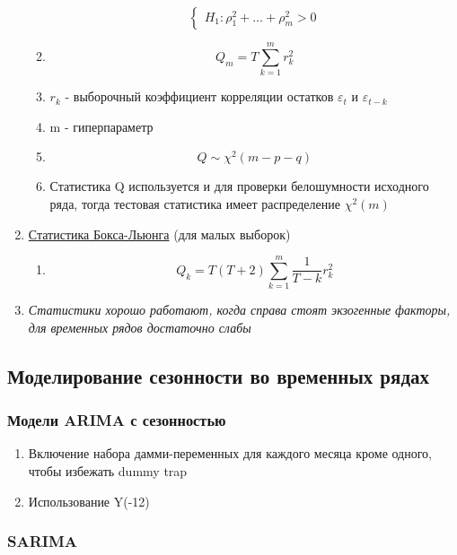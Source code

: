 \documentclass[a4paper, 12pt]{article}
\begin{document}
\begin{enumerate}
\begin{enumerate}
\[\begin{cases}
                    H_1: \rho_1^2 + \ldots + \rho^2_m > 0
            \end{cases}
        \]
        \item \[
            Q_m = T\sum_{k = 1}^m r_k^2
        \]
        \item $r_k$ - выборочный коэффициент корреляции остатков $\varepsilon_t$ и $\varepsilon_{t - k}$
        \item m - гиперпараметр
        \item \[
            Q \sim \chi^{2}(m - p - q)
        \]
        \item Статистика Q используется и для проверки белошумности исходного ряда, тогда тестовая статистика имеет распределение $\chi^{2}(m)$
    \end{enumerate}
    \item \underline{Статистика Бокса-Льюнга} (для малых выборок)
    \begin{enumerate}
        \item \[Q_k = T(T + 2)\sum_{k = 1}^m \frac{1}{T - k}r_{k}^2\]
    \end{enumerate}
    \item \textit{Статистики хорошо работают, когда справа стоят экзогенные факторы, для временных рядов достаточно слабы}
\end{enumerate}

\subsection{Моделирование сезонности во временных рядах}

\subsubsection{Модели ARIMA с сезонностью}

\begin{enumerate}
    \item Включение набора дамми-переменных для каждого месяца кроме одного, чтобы избежать dummy trap
    \item Использование Y(-12)
\end{enumerate}

\subsubsection{SARIMA}
\end{document}
